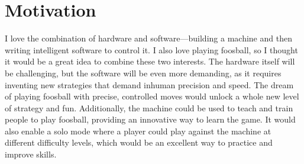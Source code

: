 \section{Motivation}\label{sec:motivation}
I love the combination of hardware and software—building a machine and then writing intelligent software to control it.
I also love playing foosball, so I thought it would be a great idea to combine these two interests.
The hardware itself will be challenging, but the software will be even more demanding, as it requires inventing new strategies that demand inhuman precision and speed.
The dream of playing foosball with precise, controlled moves would unlock a whole new level of strategy and fun.
Additionally, the machine could be used to teach and train people to play foosball, providing an innovative way to learn the game.
It would also enable a solo mode where a player could play against the machine at different difficulty levels, which would be an excellent way to practice and improve skills.
